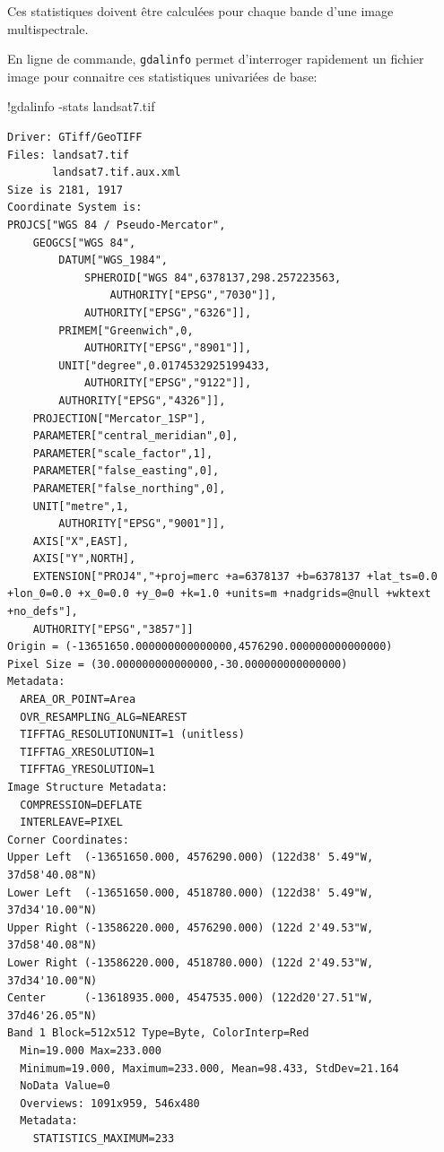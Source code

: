 \documentclass[
  11pt,
  letterpaper,
  open=any,
  twoside=false,
  french]{scrbook}
\newenvironment{Shaded}{\begin{snugshade}}{\end{snugshade}}
\newcommand{\NormalTok}[1]{\textcolor[rgb]{0.00,0.23,0.31}{#1}}
\newcommand{\OperatorTok}[1]{\textcolor[rgb]{0.37,0.37,0.37}{#1}}
\begin{document}
Ces statistiques doivent être calculées pour chaque bande d'une image
multispectrale.

En ligne de commande, \texttt{gdalinfo} permet d'interroger rapidement
un fichier image pour connaitre ces statistiques univariées de base:

\begin{Shaded}
\begin{Highlighting}[]
\OperatorTok{!}\NormalTok{gdalinfo }\OperatorTok{{-}}\NormalTok{stats landsat7.tif}
\end{Highlighting}
\end{Shaded}

\begin{verbatim}
Driver: GTiff/GeoTIFF
Files: landsat7.tif
       landsat7.tif.aux.xml
Size is 2181, 1917
Coordinate System is:
PROJCS["WGS 84 / Pseudo-Mercator",
    GEOGCS["WGS 84",
        DATUM["WGS_1984",
            SPHEROID["WGS 84",6378137,298.257223563,
                AUTHORITY["EPSG","7030"]],
            AUTHORITY["EPSG","6326"]],
        PRIMEM["Greenwich",0,
            AUTHORITY["EPSG","8901"]],
        UNIT["degree",0.0174532925199433,
            AUTHORITY["EPSG","9122"]],
        AUTHORITY["EPSG","4326"]],
    PROJECTION["Mercator_1SP"],
    PARAMETER["central_meridian",0],
    PARAMETER["scale_factor",1],
    PARAMETER["false_easting",0],
    PARAMETER["false_northing",0],
    UNIT["metre",1,
        AUTHORITY["EPSG","9001"]],
    AXIS["X",EAST],
    AXIS["Y",NORTH],
    EXTENSION["PROJ4","+proj=merc +a=6378137 +b=6378137 +lat_ts=0.0 +lon_0=0.0 +x_0=0.0 +y_0=0 +k=1.0 +units=m +nadgrids=@null +wktext +no_defs"],
    AUTHORITY["EPSG","3857"]]
Origin = (-13651650.000000000000000,4576290.000000000000000)
Pixel Size = (30.000000000000000,-30.000000000000000)
Metadata:
  AREA_OR_POINT=Area
  OVR_RESAMPLING_ALG=NEAREST
  TIFFTAG_RESOLUTIONUNIT=1 (unitless)
  TIFFTAG_XRESOLUTION=1
  TIFFTAG_YRESOLUTION=1
Image Structure Metadata:
  COMPRESSION=DEFLATE
  INTERLEAVE=PIXEL
Corner Coordinates:
Upper Left  (-13651650.000, 4576290.000) (122d38' 5.49"W, 37d58'40.08"N)
Lower Left  (-13651650.000, 4518780.000) (122d38' 5.49"W, 37d34'10.00"N)
Upper Right (-13586220.000, 4576290.000) (122d 2'49.53"W, 37d58'40.08"N)
Lower Right (-13586220.000, 4518780.000) (122d 2'49.53"W, 37d34'10.00"N)
Center      (-13618935.000, 4547535.000) (122d20'27.51"W, 37d46'26.05"N)
Band 1 Block=512x512 Type=Byte, ColorInterp=Red
  Min=19.000 Max=233.000 
  Minimum=19.000, Maximum=233.000, Mean=98.433, StdDev=21.164
  NoData Value=0
  Overviews: 1091x959, 546x480
  Metadata:
    STATISTICS_MAXIMUM=233

\end{verbatim}
\end{document}
